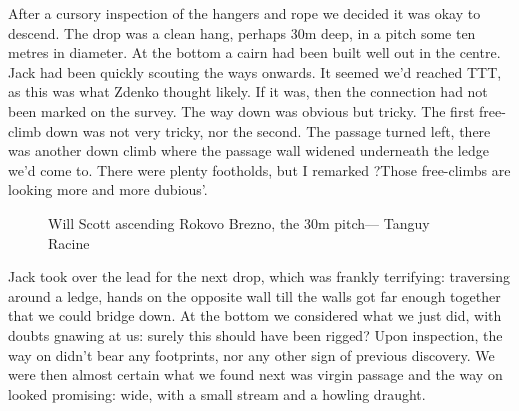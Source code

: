After a cursory inspection of the hangers and rope we decided it was okay to descend. The drop was a clean hang, perhaps 30m deep, in a pitch some ten metres in diameter. At the bottom a cairn had been built well out in the centre. Jack had been quickly scouting the ways onwards. It seemed we'd reached TTT, as this was what Zdenko thought likely. If it was, then the connection had not been marked on the survey. The way down was obvious but tricky. The first free-climb down was not very tricky, nor the second. The passage turned left, there was another down climb where the passage wall widened underneath the ledge we'd come to. There were plenty footholds, but I remarked ?Those free-climbs are looking more and more dubious'. 

\begin{figure}[t!]
\centering
{}
\caption{Will Scott ascending Rokovo Brezno, the 30m pitch--- Tanguy Racine}
\label{Rokovobrezno}
\end{figure}

Jack took over the lead for the next drop, which was frankly terrifying: traversing around a ledge, hands on the opposite wall till the walls got far enough together that we could bridge down. At the bottom we considered what we just did, with doubts gnawing at us: surely this should have been rigged? Upon inspection, the way on didn't bear any footprints, nor any other sign of previous discovery. We were then almost certain what we found next was virgin passage and the way on looked promising: wide, with a small stream and a howling draught.

